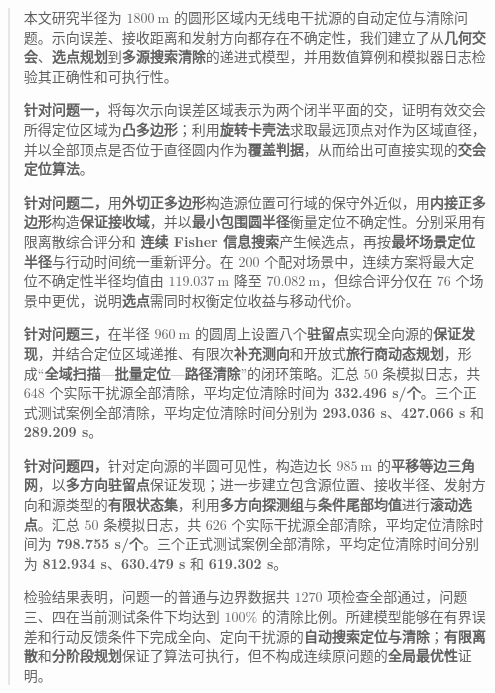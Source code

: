 \begin{abstract}
本文研究半径为 $1800\ \mathrm m$ 的圆形区域内无线电干扰源的自动定位与清除问题。示向误差、接收距离和发射方向都存在不确定性，我们建立了从\textbf{几何交会}、\textbf{选点规划}到\textbf{多源搜索清除}的递进式模型，并用数值算例和模拟器日志检验其正确性和可执行性。

\textbf{针对问题一，}将每次示向误差区域表示为两个闭半平面的交，证明有效交会所得定位区域为\textbf{凸多边形}；利用\textbf{旋转卡壳法}求取最远顶点对作为区域直径，并以全部顶点是否位于直径圆内作为\textbf{覆盖判据}，从而给出可直接实现的\textbf{交会定位算法}。

\textbf{针对问题二，}用\textbf{外切正多边形}构造源位置可行域的保守外近似，用\textbf{内接正多边形}构造\textbf{保证接收域}，并以\textbf{最小包围圆半径}衡量定位不确定性。分别采用有限离散综合评分和 \textbf{连续 Fisher 信息搜索}产生候选点，再按\textbf{最坏场景定位半径}与行动时间统一重新评分。在 $200$ 个配对场景中，连续方案将最大定位不确定性半径均值由 $119.037\ \mathrm m$ 降至 $70.082\ \mathrm m$，但综合评分仅在 $76$ 个场景中更优，说明\textbf{选点}需同时权衡定位收益与移动代价。

\textbf{针对问题三，}在半径 $960\ \mathrm m$ 的圆周上设置八个\textbf{驻留点}实现全向源的\textbf{保证发现}，并结合定位区域递推、有限次\textbf{补充测向}和开放式\textbf{旅行商动态规划}，形成“\textbf{全域扫描}---\textbf{批量定位}---\textbf{路径清除}”的闭环策略。汇总 $50$ 条模拟日志，共 $648$ 个实际干扰源全部清除，平均定位清除时间为 \textbf{332.496 s/个}。三个正式测试案例全部清除，平均定位清除时间分别为 \textbf{293.036 s}、\textbf{427.066 s} 和 \textbf{289.209 s}。

\textbf{针对问题四，}针对定向源的半圆可见性，构造边长 $985\ \mathrm m$ 的\textbf{平移等边三角网}，以\textbf{多方向驻留点}保证发现；进一步建立包含源位置、接收半径、发射方向和源类型的\textbf{有限状态集}，利用\textbf{多方向探测组}与\textbf{条件尾部均值}进行\textbf{滚动选点}。汇总 $50$ 条模拟日志，共 $626$ 个实际干扰源全部清除，平均定位清除时间为 \textbf{798.755 s/个}。三个正式测试案例全部清除，平均定位清除时间分别为 \textbf{812.934 s}、\textbf{630.479 s} 和 \textbf{619.302 s}。

检验结果表明，问题一的普通与边界数据共 $1270$ 项检查全部通过，问题三、四在当前测试条件下均达到 $100\%$ 的清除比例。所建模型能够在有界误差和行动反馈条件下完成全向、定向干扰源的\textbf{自动搜索定位与清除}；\textbf{有限离散}和\textbf{分阶段规划}保证了算法可执行，但不构成连续原问题的\textbf{全局最优性}证明。

\end{abstract}
